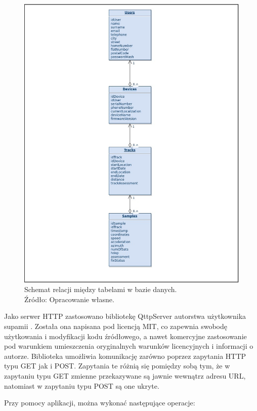 \begin{figure}[H]
	\centering
	\includegraphics[width=17cm]{img/software/database/Database_relations.jpg}
	\caption{Schemat relacji między tabelami w bazie danych. 
	\\Źródło: Opracowanie własne.}
	\label{fig:image_soft_db_relations}
\end{figure}

Jako serwer HTTP zastosowano bibliotekę QttpServer autorstwa użytkownika supamii \cite{qttpserver}. Została ona napisana pod licencją MIT, co zapewnia swobodę użytkowania i modyfikacji kodu źródłowego, a nawet komercyjne zastosowanie pod warunkiem umieszczenia oryginalnych warunków licencyjnych i informacji o autorze. Biblioteka umożliwia komunikację zarówno poprzez zapytania HTTP typu GET jak i POST. Zapytania te różnią się pomiędzy sobą tym, że w zapytaniu typu GET zmienne przekazywane są jawnie wewnątrz adresu URL, natomiast w zapytaniu typu POST są one ukryte.

Przy pomocy aplikacji, można wykonać następujące operacje:

